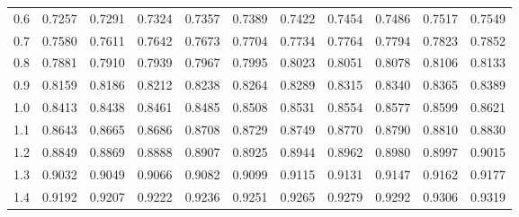 \begin{table}[p]
\begin{center}
{\begin{tabular}{c | rrrrr | rrrrr |}
  0.6 & \footnotesize{0.7257} & \footnotesize{0.7291} & \footnotesize{0.7324} & \footnotesize{0.7357} & \footnotesize{0.7389} & \footnotesize{0.7422} & \footnotesize{0.7454} & \footnotesize{0.7486} & \footnotesize{0.7517} & \footnotesize{0.7549} \\
  0.7 & \footnotesize{0.7580} & \footnotesize{0.7611} & \footnotesize{0.7642} & \footnotesize{0.7673} & \footnotesize{0.7704} & \footnotesize{0.7734} & \footnotesize{0.7764} & \footnotesize{0.7794} & \footnotesize{0.7823} & \footnotesize{0.7852} \\
  0.8 & \footnotesize{0.7881} & \footnotesize{0.7910} & \footnotesize{0.7939} & \footnotesize{0.7967} & \footnotesize{0.7995} & \footnotesize{0.8023} & \footnotesize{0.8051} & \footnotesize{0.8078} & \footnotesize{0.8106} & \footnotesize{0.8133} \\
  0.9 & \footnotesize{0.8159} & \footnotesize{0.8186} & \footnotesize{0.8212} & \footnotesize{0.8238} & \footnotesize{0.8264} & \footnotesize{0.8289} & \footnotesize{0.8315} & \footnotesize{0.8340} & \footnotesize{0.8365} & \footnotesize{0.8389} \\
  \hline
  \hline
  1.0 & \footnotesize{0.8413} & \footnotesize{0.8438} & \footnotesize{0.8461} & \footnotesize{0.8485} & \footnotesize{0.8508} & \footnotesize{0.8531} & \footnotesize{0.8554} & \footnotesize{0.8577} & \footnotesize{0.8599} & \footnotesize{0.8621} \\
  1.1 & \footnotesize{0.8643} & \footnotesize{0.8665} & \footnotesize{0.8686} & \footnotesize{0.8708} & \footnotesize{0.8729} & \footnotesize{0.8749} & \footnotesize{0.8770} & \footnotesize{0.8790} & \footnotesize{0.8810} & \footnotesize{0.8830} \\
  1.2 & \footnotesize{0.8849} & \footnotesize{0.8869} & \footnotesize{0.8888} & \footnotesize{0.8907} & \footnotesize{0.8925} & \footnotesize{0.8944} & \footnotesize{0.8962} & \footnotesize{0.8980} & \footnotesize{0.8997} & \footnotesize{0.9015} \\
  1.3 & \footnotesize{0.9032} & \footnotesize{0.9049} & \footnotesize{0.9066} & \footnotesize{0.9082} & \footnotesize{0.9099} & \footnotesize{0.9115} & \footnotesize{0.9131} & \footnotesize{0.9147} & \footnotesize{0.9162} & \footnotesize{0.9177} \\
  1.4 & \footnotesize{0.9192} & \footnotesize{0.9207} & \footnotesize{0.9222} & \footnotesize{0.9236} & \footnotesize{0.9251} & \footnotesize{0.9265} & \footnotesize{0.9279} & \footnotesize{0.9292} & \footnotesize{0.9306} & \footnotesize{0.9319} \\

\end{tabular}}
\end{center}
\end{table}
